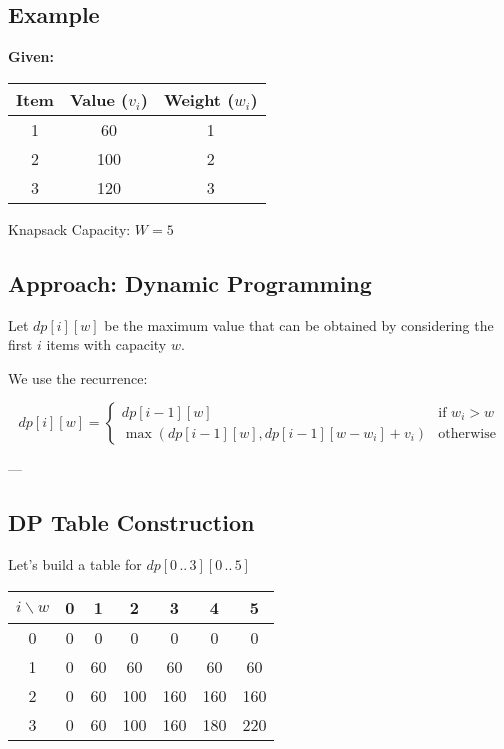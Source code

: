 \documentclass[14pt]{extarticle}
\begin{document}
\subsection*{Example}

\textbf{Given:}

\begin{center}
\begin{tabular}{|c|c|c|}
\hline
\textbf{Item} & \textbf{Value ($v_i$)} & \textbf{Weight ($w_i$)} \\
\hline
1 & 60 & 1 \\
2 & 100 & 2 \\
3 & 120 & 3 \\
\hline
\end{tabular}
\end{center}

Knapsack Capacity: $W = 5$

\subsection*{Approach: Dynamic Programming}

Let $dp[i][w]$ be the maximum value that can be obtained by considering the first $i$ items with capacity $w$.

We use the recurrence:

\[
dp[i][w] =
\begin{cases}
    dp[i-1][w] & \text{if } w_i > w \\
    \max(dp[i-1][w], dp[i-1][w - w_i] + v_i) & \text{otherwise}
\end{cases}
\]

---

\subsection*{DP Table Construction}

Let’s build a table for $dp[0\,..\,3][0\,..\,5]$

\begin{center}
\begin{tabular}{|c|c|c|c|c|c|c|}
\hline
$i \backslash w$ & 0 & 1 & 2 & 3 & 4 & 5 \\
\hline
0 & 0 & 0 & 0 & 0 & 0 & 0 \\
1 & 0 & 60 & 60 & 60 & 60 & 60 \\
2 & 0 & 60 & 100 & 160 & 160 & 160 \\
3 & 0 & 60 & 100 & 160 & 180 & 220 \\
\hline
\end{tabular}
\end{center}
\end{document}
